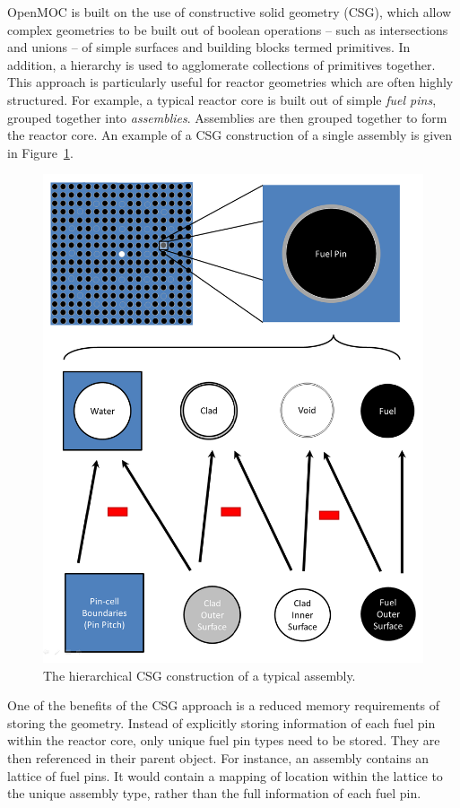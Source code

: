 OpenMOC is built on the use of constructive solid geometry (CSG), which allow complex geometries to be built out of boolean operations -- such as intersections and unions -- of simple surfaces and building blocks termed primitives. In addition, a hierarchy is used to agglomerate collections of primitives together. This approach is particularly useful for reactor geometries which are often highly structured. For example, a typical reactor core is built out of simple \textit{fuel pins}, grouped together into \textit{assemblies}. Assemblies are then grouped together to form the reactor core. An example of a CSG construction of a single assembly is given in Figure~\ref{fig:core-csg}.

\begin{figure}[h!]
	\centering
	\includegraphics[width=0.9\linewidth]{figures/assembly-csg.PNG}
	\caption[]{The hierarchical CSG construction of a typical assembly.}
	\label{fig:core-csg}
\end{figure}

One of the benefits of the CSG approach is a reduced memory requirements of storing the geometry. Instead of explicitly storing information of each fuel pin within the reactor core, only unique fuel pin types need to be stored. They are then referenced in their parent object. For instance, an assembly contains an lattice of fuel pins. It would contain a mapping of location within the lattice to the unique assembly type, rather than the full information of each fuel pin.

